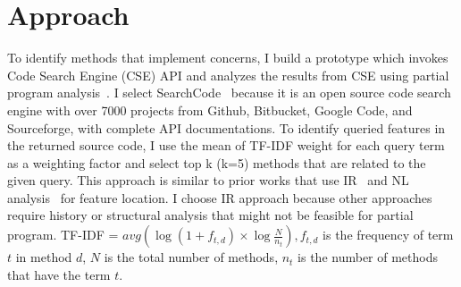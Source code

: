 \section{Approach}

To identify methods that implement concerns, I build a prototype which invokes Code Search Engine (CSE) API and analyzes the results from CSE using partial program analysis~\cite{partialProgram:OOPSLA08}. I select SearchCode~\cite{SearchCode} because it is an open source code search engine with over 7000 projects from  Github, Bitbucket, Google Code, and Sourceforge, with complete API documentations. To identify queried features in the returned source code,  I use the mean of TF-IDF weight  for each query term as a weighting factor and select top k (k=5) methods that are related to the given query.  This approach is similar to prior works that use  IR~\cite{Denys:FCA12} and NL analysis~\cite{Hill:FindConcept07} for feature location. I choose IR approach because other approaches require history or structural analysis that might not be feasible for partial program. TF-IDF =  $avg( \log (1 + f_{t,d}) \times  \log \frac {N} {n_t}), f_{t,d}$ is the frequency of term $t$ in method $d$, $N$ is the total number of methods, $n_t$ is the number of methods that have the term $t$.
